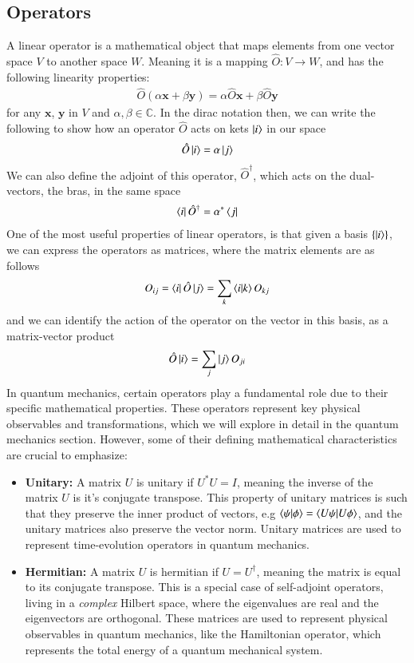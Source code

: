 \documentclass{subfiles}
\begin{document}
\subsection*{Operators}
A linear operator is a mathematical object that maps elements from one vector space $V$ to another space $W$. Meaning it is a mapping $\hat O: V \rightarrow W$, and has the following linearity properties:
\begin{align*}
    \hat O(\alpha \mathbf{x} + \beta\mathbf{y}) = \alpha \hat O\mathbf{x} + \beta \hat O\mathbf{y}
\end{align*}
for any $\mathbf{x}$, $\mathbf{y}$ in $V$ and $\alpha, \beta\in \mathbb{C}$. In the dirac notation then, we can write the following to show how an operator $\hat O$ acts on kets $\ket{i}$ in our space
\begin{align*}
    \hat O\ket{i} = \alpha \ket{j}
\end{align*}
We can also define the adjoint of this operator, $\hat O^\dagger$, which acts on the dual-vectors, the bras, in the same space
\begin{align*}
    \bra{i}\hat O^\dagger = \alpha^* \bra{j}
\end{align*}
One of the most useful properties of linear operators, is that given a basis $\{\ket{i}\}$, we can express the operators as matrices, where the matrix elements are as follows
\begin{align*}
    O_{ij} = \bra{i}\hat O\ket{j} = \sum_k\braket{i|k}O_{kj}
\end{align*}
and we can identify the action of the operator on the vector in this basis, as a matrix-vector product
\begin{align*}
    \hat O\ket{i} = \sum_j \ket{j}O_{ji}
\end{align*}
In quantum mechanics, certain operators play a fundamental role due to their specific mathematical properties. These operators represent key physical observables and transformations, which we will explore in detail in the quantum mechanics section. However, some of their defining mathematical characteristics are crucial to emphasize:
\begin{itemize}
    \item \textbf{Unitary:} A matrix $U$ is unitary if $U^*U = I$, meaning the inverse of the matrix $U$ is it's conjugate transpose. This property of unitary matrices is such that they preserve the inner product of vectors, e.g $\braket{\psi|\phi} = \braket{U\psi|U\phi}$, and the unitary matrices also preserve the vector norm. Unitary matrices are used to represent time-evolution operators in quantum mechanics.
    \item \textbf{Hermitian:} A matrix $U$ is hermitian if $U = U^\dagger$, meaning the matrix is equal to its conjugate transpose. This is a special case of self-adjoint operators, living in a \emph{complex} Hilbert space, where the eigenvalues are real and the eigenvectors are orthogonal. These matrices are used to represent physical observables in quantum mechanics, like the Hamiltonian operator, which represents the total energy of a quantum mechanical system.
\end{itemize}
\end{document}
